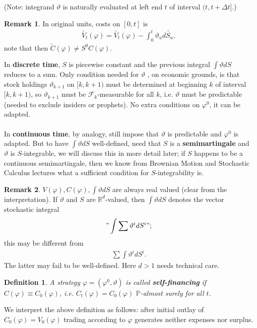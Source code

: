 \documentclass[12pt,a4paper, twoside]{article}
\newtheorem{defn}{Definition}[section]
\theoremstyle{definition}
\newtheorem{rem}{Remark}[section]
\begin{document}
(Note: integrand $\vartheta$ is naturally evaluated at left end $t$ of interval $(t, t + \Delta t]$.)
\newpage
\begin{rem} In original units, costs on $[0,t]$ is 
\begin{align*}
\widetilde{V_t}( \varphi) = \widetilde{V_t}( \varphi) - \int_0^t  \vartheta_u d \widetilde{S_u},
\end{align*}
note that then $\widetilde{C}( \varphi) \neq S^0 C( \varphi)$. 
\end{rem}
In \textbf{discrete time}, $S$ is piecewise constant and the previous integral $\int \vartheta d S$ reduces to a sum. Only condition needed for $\vartheta$ , on economic grounds, is that stock holdings $\vartheta_{k+1}$ on $[k,k+1)$ must be determined at beginning $k$ of interval $[k,k+1)$, so $\vartheta_{k+1}$ must be $\mathcal{F}_k$-measurable for all $k$,  i.e. $\vartheta$ must be predictable (needed to exclude insiders or prophets). No extra conditions on $\varphi^0$, it can be adapted. 
\\\\
In \textbf{continuous time}, by analogy,  still impose that $\vartheta$ is predictable and $\varphi^0$ is adapted. But to have $\int \vartheta d S$ well-defined, need that $S$ is a \textbf{semimartingale} and $\vartheta$ is $S$-integrable, we will discuss this in more detail later; if $S$ happens to be a continuous semimartingale, then we know from Brownian Motion and Stochastic Calculus lectures what a sufficient condition for $S$-integrability is. 
\begin{rem} $V( \varphi), C( \varphi), \int \vartheta dS$ are always real valued (clear from the interpretation). If $\vartheta$ and $S$ are $\mathbb{R}^d$-valued, then $\int \vartheta dS$ denotes the vector stochastic integral 
\begin{align*}
" \int \sum \vartheta^i dS^i ";
\end{align*}
this may be different from 
\begin{align*}
\sum \int \vartheta^i d S^i. 
\end{align*}
The latter may fail to be well-defined. Here $d>1$ needs technical care. 
\end{rem}
\begin{defn} A strategy $\varphi = ( \varphi^0, \vartheta)$ is called \textbf{self-financing} if $C( \varphi)\equiv C_0( \varphi)$, i.e. $C_t( \varphi) = C_0( \varphi)$ $\mathbb{P}$-almost surely for all $t$. 
\end{defn}
We interpret the above definition as follows: after initial outlay of $C_0( \varphi)= V_0( \varphi)$ trading according to $\varphi$ generates neither expenses nor surplus. 
\end{document}
